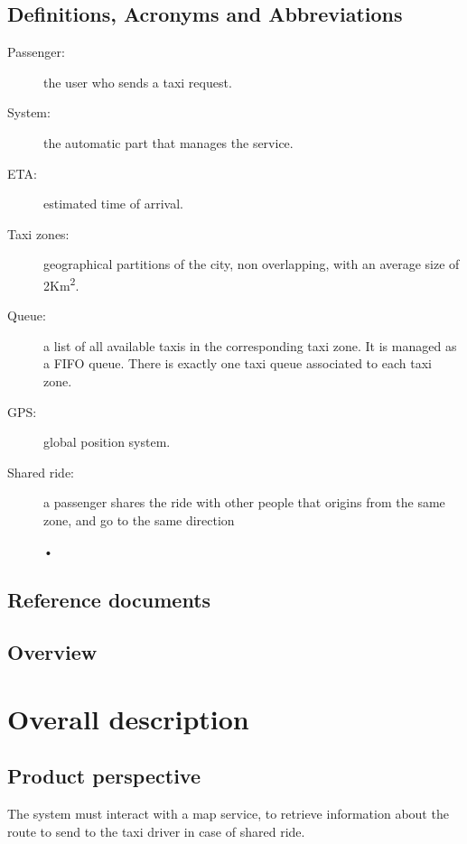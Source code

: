 \documentclass[a4paper,11pt]{report}
\begin{document}
\section{Definitions, Acronyms and Abbreviations}
\begin{description}
  \item[Passenger:] the user who sends a taxi request.
  \item[System:] the automatic part that manages the service.  %
  \item[ETA:] estimated time of arrival.
  \item[Taxi zones:] geographical partitions of the city, non overlapping, with an average size of 2Km\textsuperscript{2}.
  \item[Queue:] a list of all available taxis in the corresponding taxi zone. It is managed as a FIFO queue.
    There is exactly one taxi queue associated to each taxi zone.
  \item[GPS:] global position system.
  \item[Shared ride:] a passenger shares the ride with other people that origins from the same zone, and go to the same direction
    \begin{center}
    •
    \end{center}
\end{description}
 
\section{Reference documents}

\section{Overview}


\chapter*{Overall description}
\addtocounter{chapter}{1}
\section{Product perspective}
The system must interact with a map service, to retrieve information about the route to send to the taxi driver in case of shared ride.
\end{document}
